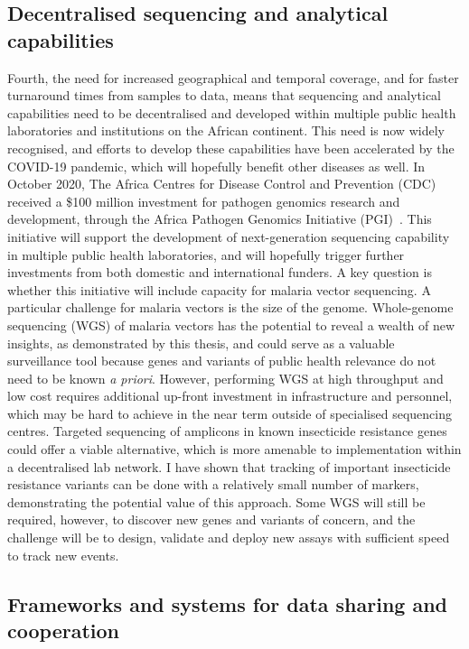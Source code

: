 \documentclass[a4paper,11pt,abstracton,hidelinks]{scrartcl}
\begin{document}
\subsection{Decentralised sequencing and analytical capabilities}


Fourth, the need for increased geographical and temporal coverage, and for faster turnaround times from samples to data, means that sequencing and analytical capabilities need to be decentralised and developed within multiple public health laboratories and institutions on the African continent.
%
This need is now widely recognised, and efforts to develop these capabilities have been accelerated by the COVID-19 pandemic, which will hopefully benefit other diseases as well.
%
In October 2020, The Africa Centres for Disease Control and Prevention (CDC) received a \$100 million investment for pathogen genomics research and development, through the Africa Pathogen Genomics Initiative (PGI)~\parencite{Makoni2020}.
%
This initiative will support the development of next-generation sequencing capability in multiple public health laboratories, and will hopefully trigger further investments from both domestic and international funders.
%
A key question is whether this initiative will include capacity for malaria vector sequencing.
%
A particular challenge for malaria vectors is the size of the genome.
%
Whole-genome sequencing (WGS) of malaria vectors has the potential to reveal a wealth of new insights, as demonstrated by this thesis, and could serve as a valuable surveillance tool because genes and variants of public health relevance do not need to be known \textit{a priori}.
%
However, performing WGS at high throughput and low cost requires additional up-front investment in infrastructure and personnel, which may be hard to achieve in the near term outside of specialised sequencing centres.
%
Targeted sequencing of amplicons in known insecticide resistance genes could offer a viable alternative, which is more amenable to implementation within a decentralised lab network.
%
I have shown that tracking of important insecticide resistance variants can be done with a relatively small number of markers, demonstrating the potential value of this approach.
%
Some WGS will still be required, however, to discover new genes and variants of concern, and the challenge will be to design, validate and deploy new assays with sufficient speed to track new events.


\subsection{Frameworks and systems for data sharing and cooperation}
\end{document}
